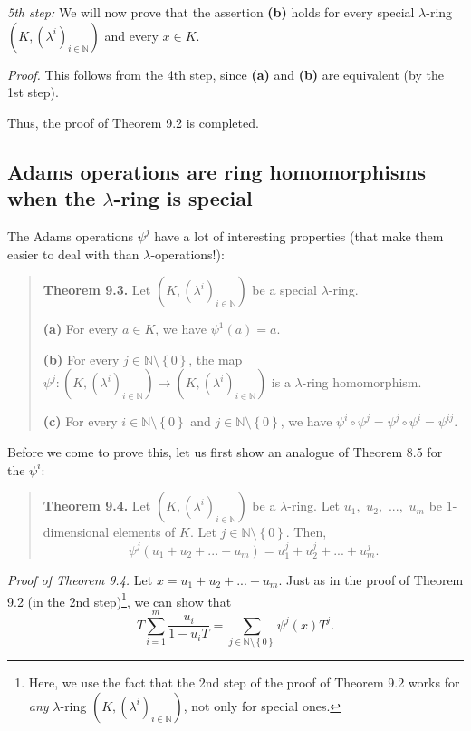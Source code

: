 \documentclass[numbers=enddot,12pt,final,onecolumn,notitlepage]{scrartcl}%
\begin{document}
\textit{5th step:} We will now prove that the assertion \textbf{(b)} holds for
every special $\lambda$-ring $\left(  K,\left(  \lambda^{i}\right)
_{i\in\mathbb{N}}\right)  $ and every $x\in K$.

\textit{Proof.} This follows from the 4th step, since \textbf{(a)} and
\textbf{(b)} are equivalent (by the 1st step).

Thus, the proof of Theorem 9.2 is completed.

\subsection{Adams operations are ring homomorphisms when the $\lambda$-ring is
special}

The Adams operations $\psi^{j}$ have a lot of interesting properties (that
make them easier to deal with than $\lambda$-operations!):

\begin{quote}
\textbf{Theorem 9.3.} Let $\left(  K,\left(  \lambda^{i}\right)
_{i\in\mathbb{N}}\right)  $ be a special $\lambda$-ring.

\textbf{(a)} For every $a\in K$, we have $\psi^{1}\left(  a\right)  =a$.

\textbf{(b)} For every $j\in\mathbb{N}\setminus\left\{  0\right\}  $, the map
$\psi^{j}:\left(  K,\left(  \lambda^{i}\right)  _{i\in\mathbb{N}}\right)
\rightarrow\left(  K,\left(  \lambda^{i}\right)  _{i\in\mathbb{N}}\right)  $
is a $\lambda$-ring homomorphism.

\textbf{(c)} For every $i\in\mathbb{N}\setminus\left\{  0\right\}  $ and
$j\in\mathbb{N}\setminus\left\{  0\right\}  $, we have $\psi^{i}\circ\psi
^{j}=\psi^{j}\circ\psi^{i}=\psi^{ij}$.
\end{quote}

Before we come to prove this, let us first show an analogue of Theorem 8.5 for
the $\psi^{i}$:

\begin{quote}
\textbf{Theorem 9.4.} Let $\left(  K,\left(  \lambda^{i}\right)
_{i\in\mathbb{N}}\right)  $ be a $\lambda$-ring. Let $u_{1},$ $u_{2},$ $...,$
$u_{m}$ be $1$-dimensional elements of $K$. Let $j\in\mathbb{N}\setminus
\left\{  0\right\}  $. Then,%
\[
\psi^{j}\left(  u_{1}+u_{2}+...+u_{m}\right)  =u_{1}^{j}+u_{2}^{j}%
+...+u_{m}^{j}.
\]



\end{quote}

\textit{Proof of Theorem 9.4.} Let $x=u_{1}+u_{2}+...+u_{m}$. Just as in the
proof of Theorem 9.2 (in the 2nd step)\footnote{Here, we use the fact that the
2nd step of the proof of Theorem 9.2 works for \textit{any} $\lambda$-ring
$\left(  K,\left(  \lambda^{i}\right)  _{i\in\mathbb{N}}\right)  $, not only
for special ones.}, we can show that%
\[
T\sum\limits_{i=1}^{m}\dfrac{u_{i}}{1-u_{i}T}=\sum\limits_{j\in\mathbb{N}%
\setminus\left\{  0\right\}  }\psi^{j}\left(  x\right)  T^{j}.
\]
\end{document}

